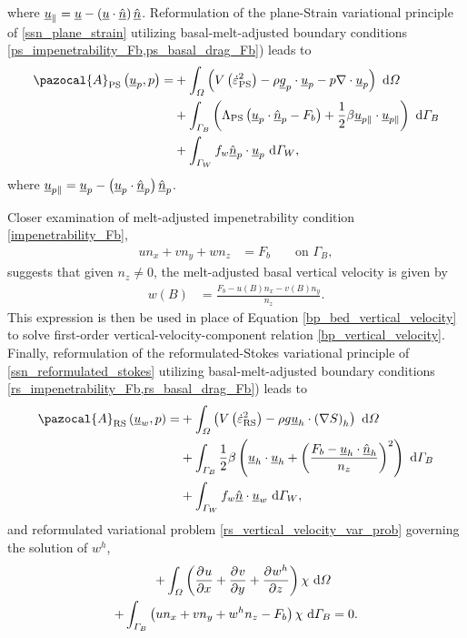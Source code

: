 where $\underline{u}_{\Vert} = \underline{u} - \left( \underline{u} \cdot \underline{\hat{n}} \right) \underline{\hat{n}}$.  Reformulation of the plane-Strain variational principle of \cref{ssn_plane_strain} utilizing basal-melt-adjusted boundary conditions \cref{ps_impenetrability_Fb,ps_basal_drag_Fb}) leads to
\begin{align}
  \label{ps_action_Fb}
  \pazocal{A}_{\text{PS}} \left(\rankone{u}_p, p\right) = &+ \int_{\Omega} \left( V\left( \dot{\varepsilon}_{\text{PS}}^2 \right) - \rho \rankone{g}_p \cdot \rankone{u}_p - p \nabla \cdot \rankone{u}_p \right) \d{\Omega} \notag \\
  &+ \int_{\Gamma_B} \left( \Lambda_{\text{PS}} \left( \rankone{u}_p \cdot \normal_p - F_b \right) + \frac{1}{2} \beta \rankone{u}_{p\Vert} \cdot \rankone{u}_{p\Vert} \right) \d{\Gamma_B} \notag \\
  &+ \int_{\Gamma_W} f_w \normal_p \cdot \rankone{u}_p \d{\Gamma_W},
\end{align}
where $\underline{u}_{p\Vert} = \underline{u}_p - \left( \underline{u}_p \cdot \underline{\hat{n}}_p \right) \underline{\hat{n}}_p$.

Closer examination of melt-adjusted impenetrability condition \cref{impenetrability_Fb},
\begin{align*}
  u n_x + v n_y + w n_z &= F_b  &&\text{ on } \Gamma_B,
\end{align*}
suggests that given $n_z \neq 0$, the melt-adjusted basal vertical velocity is given by
\begin{align}
  \label{bp_bed_vertical_velocity_Fb}
  w(B) &= \frac{F_b - u(B)n_x - v(B)n_y}{n_z}.
\end{align}
This expression is then be used in place of Equation \cref{bp_bed_vertical_velocity} to solve first-order vertical-velocity-component relation \cref{bp_vertical_velocity}.  Finally, reformulation of the reformulated-Stokes variational principle of \cref{ssn_reformulated_stokes} utilizing basal-melt-adjusted boundary conditions \cref{rs_impenetrability_Fb,rs_basal_drag_Fb}) leads to
\begin{align}
  \label{rs_action_Fb}
  \pazocal{A}_{\text{RS}} \left(\rankone{u}_w, p\right) = &+ \int_{\Omega} \left( V\left( \dot{\varepsilon}_{\text{RS}}^2 \right) - \rho g \rankone{u}_h \cdot \left( \nabla S \right)_h \right) \d{\Omega} \notag \\
  &+ \int_{\Gamma_B} \frac{1}{2} \beta \left( \rankone{u}_h \cdot \rankone{u}_h + \left( \frac{F_b - \rankone{u}_h \cdot \normal_h}{n_z} \right)^2 \right) \d{\Gamma_B} \notag \\
  &+ \int_{\Gamma_W} f_w \normal \cdot \rankone{u}_w \d{\Gamma_W},
\end{align}
and reformulated variational problem \cref{rs_vertical_velocity_var_prob} governing the solution of $w^h$,
\begin{align}
  \label{rs_vertical_velocity_var_prob_Fb}
  + \int_{\varOmega} \left( \frac{\partial{^{}} u}{\partial x{^{}} } + \frac{\partial{^{}} v}{\partial y{^{}} } + \frac{\partial{^{}} w^h}{\partial z{^{}} } \right)\chi \ \mathrm{d}\varOmega & \\
  + \int_{\varGamma_B} \left( u n_x + v n_y + w^h n_z - F_b \right) \chi \ \mathrm{d}\varGamma_B &= 0.
\end{align}

